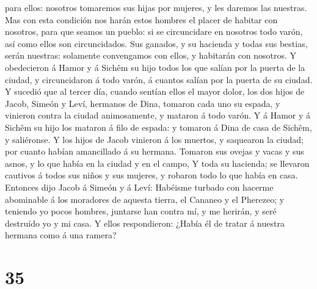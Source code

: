 para ellos: nosotros tomaremos sus hijas por mujeres, y les daremos las
nuestras.  Mas con esta condición nos harán estos hombres
el placer de habitar con nosotros, para que seamos un pueblo: si se
circuncidare en nosotros todo varón, así como ellos son circuncidados.
 Sus ganados, y su hacienda y todas sus bestias, serán
nuestras: solamente convengamos con ellos, y habitarán con nosotros.
 Y obedecieron á Hamor y á Sichêm su hijo todos los que
salían por la puerta de la ciudad, y circuncidaron á todo varón, á
cuantos salían por la puerta de su ciudad.  Y sucedió que
al tercer día, cuando sentían ellos el mayor dolor, los dos hijos de
Jacob, Simeón y Leví, hermanos de Dina, tomaron cada uno su espada, y
vinieron contra la ciudad animosamente, y mataron á todo varón.
 Y á Hamor y á Sichêm su hijo los mataron á filo de espada:
y tomaron á Dina de casa de Sichêm, y saliéronse.  Y los
hijos de Jacob vinieron á los muertos, y saquearon la ciudad; por cuanto
habían amancillado á su hermana.  Tomaron sus ovejas y
vacas y sus asnos, y lo que había en la ciudad y en el campo,
 Y toda su hacienda; se llevaron cautivos á todos sus niños
y sus mujeres, y robaron todo lo que había en casa. 
Entonces dijo Jacob á Simeón y á Leví: Habéisme turbado con hacerme
abominable á los moradores de aquesta tierra, el Cananeo y el Pherezeo;
y teniendo yo pocos hombres, juntarse han contra mí, y me herirán, y
seré destruído yo y mi casa.  Y ellos respondieron: ¿Había
él de tratar á nuestra hermana como á una ramera?

\hypertarget{section-34}{%
\section{35}\label{section-34}}

